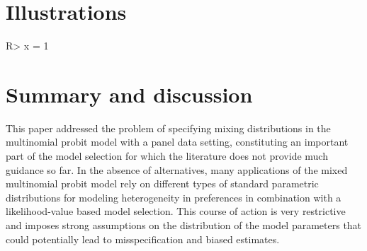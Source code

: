 \documentclass[article]{jss}
\begin{document}

\section{Illustrations} \label{sec:illustrations}

%
\begin{Schunk}
\begin{Sinput}
R> x = 1
\end{Sinput}
\end{Schunk}
%



\section{Summary and discussion} \label{sec:summary}

This paper addressed the problem of specifying mixing distributions in the multinomial probit model with a panel data setting, constituting an important part of the model selection for which the literature does not provide much guidance so far. In the absence of alternatives, many applications of the mixed multinomial probit model rely on different types of standard parametric distributions for modeling heterogeneity in preferences in combination with a likelihood-value based model selection. This course of action is very restrictive and imposes strong assumptions on the distribution of the model parameters that could potentially lead to misspecification and biased estimates.
\end{document}
